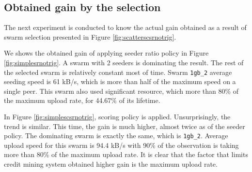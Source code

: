 \subsection{Obtained gain by the selection}
The next experiment is conducted to know the actual gain obtained as a result of swarm selection presented in Figure \ref{fig:scatterscsrnotrig}. 

We shows the obtained gain of applying seeder ratio policy in Figure \ref{fig:simplesrnotrig}. A swarm with 2 seeders is dominating the result. The rest of the selected swarm is relatively constant most of time. Swarm \texttt{1gb\_2} average seeding speed is 61 kB/s, which is more than half of the maximum speed on a single peer. This swarm also used significant resource, which more than 80\% of the maximum upload rate, for 44.67\% of its lifetime. 

In Figure \ref{fig:simplescsrnotrig}, scoring policy is applied. Unsurprisingly, the trend is similar. This time, the gain is much higher, almost twice as of the seeder policy. The dominating swarm is exactly the same, which is \texttt{1gb\_2}. Average upload speed for this swarm is 94.4 kB/s with 90\% of the observation is taking more than 80\% of the maximum upload rate. It is clear that the factor that limits credit mining system obtained higher gain is the maximum upload rate. 

